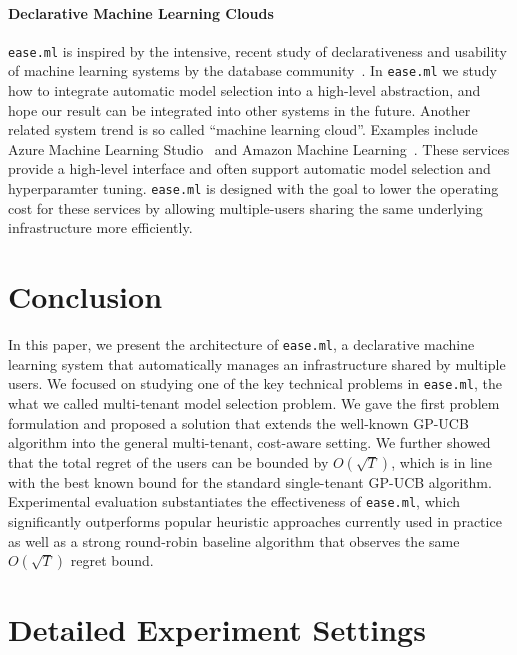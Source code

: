 \documentclass[letterpaper]{vldb}
\newcommand{\eml}{\texttt{ease.ml}\xspace}
\begin{document}
\vspace{-1em}
\paragraph*{Declarative Machine Learning Clouds} \eml is
inspired by the intensive, recent study of declarativeness
and usability of machine learning systems by the database 
community~\cite{XXX,XXX,XXX,XXX,XXX,XXX}. In \eml we 
study how to integrate automatic model selection into
a high-level abstraction, and hope our result can be integrated
into other systems in the future.
Another related system trend is so called ``machine learning
cloud''. Examples include Azure Machine Learning Studio~\cite{XXX}
and Amazon Machine Learning~\cite{XXX}. These services
provide a high-level interface and often support automatic model selection
and hyperparamter tuning. \eml is designed with the goal to
lower the operating cost for these services 
by allowing multiple-users sharing the same underlying 
infrastructure more efficiently.


\section{Conclusion}\label{sec:conclusion}

In this paper, we present the architecture of \eml, a declarative machine learning system that automatically manages an infrastructure shared by multiple users.
We focused on studying one of the key technical problems in \eml, the what we called multi-tenant model selection problem.
We gave the first problem formulation and proposed a solution that extends the well-known GP-UCB algorithm into the general multi-tenant, cost-aware setting.
We further showed that the total regret of the users can be bounded by $O(\sqrt{T})$, which is in line with the best known bound for the standard single-tenant GP-UCB algorithm.
Experimental evaluation substantiates the effectiveness of \eml, which significantly outperforms popular heuristic approaches currently used in practice as well as a strong round-robin baseline algorithm that observes the same $O(\sqrt{T})$ regret bound.


\newpage


  



\appendix


\section{Detailed Experiment Settings}
\end{document}

